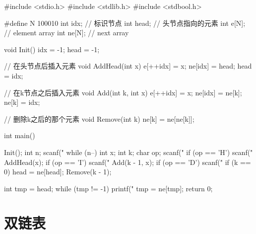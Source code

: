 \begin{mycpptwocol}
#include <stdio.h>
#include <stdlib.h>
#include <stdbool.h>

#define N 100010
int idx; // 标识节点
int head; // 头节点指向的元素
int e[N]; // element array
int ne[N]; // next array

void Init()
{
    idx = -1;
    head = -1;
}
    
// 在头节点后插入元素
void AddHead(int x) {
    e[++idx] = x;
    ne[idx] = head;
    head = idx;
}

// 在k节点之后插入元素
void Add(int k, int x)
{
    e[++idx] = x;
    ne[idx] = ne[k];
    ne[k] = idx;
}

// 删除k之后的那个元素
void Remove(int k) {
    ne[k] = ne[ne[k]];
}

int main()
{
    Init();
    int n;
    scanf("%
    while (n--) {
        int x;
        int k;
        char op;
        scanf(" %
        if (op == 'H') {
            scanf("%
            AddHead(x);
        }
        if (op == 'I') {
            scanf("%
            Add(k - 1, x);
        }
        if (op == 'D') {
            scanf("%
            if (k == 0) {
                head = ne[head];
            }
            Remove(k - 1);
        }
    }

    int tmp = head;
    while (tmp != -1) {
        printf("%
        tmp = ne[tmp];
    }
    return 0;
}
\end{mycpptwocol}

\section{双链表}

